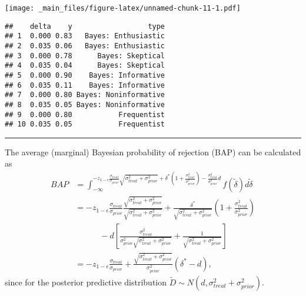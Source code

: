 \documentclass[
]{book}
\newenvironment{Shaded}{\begin{snugshade}}{\end{snugshade}}
\newcommand{\DecValTok}[1]{\textcolor[rgb]{0.00,0.00,0.81}{#1}}
\newcommand{\FunctionTok}[1]{\textcolor[rgb]{0.00,0.00,0.00}{#1}}
\newcommand{\NormalTok}[1]{#1}
\newcommand{\OtherTok}[1]{\textcolor[rgb]{0.56,0.35,0.01}{#1}}
\newcommand{\SpecialCharTok}[1]{\textcolor[rgb]{0.00,0.00,0.00}{#1}}
\newcommand{\StringTok}[1]{\textcolor[rgb]{0.31,0.60,0.02}{#1}}
\begin{document}
\texttt{[image: \_main\_files/figure-latex/unnamed-chunk-11-1.pdf]}

\begin{Shaded}
\end{Shaded}

\begin{verbatim}
##    delta    y                  type
## 1  0.000 0.83   Bayes: Enthusiastic
## 2  0.035 0.06   Bayes: Enthusiastic
## 3  0.000 0.78      Bayes: Skeptical
## 4  0.035 0.04      Bayes: Skeptical
## 5  0.000 0.90    Bayes: Informative
## 6  0.035 0.11    Bayes: Informative
## 7  0.000 0.80 Bayes: Noninformative
## 8  0.035 0.05 Bayes: Noninformative
## 9  0.000 0.80           Frequentist
## 10 0.035 0.05           Frequentist
\end{verbatim}

\begin{center}\rule{0.5\linewidth}{0.5pt}\end{center}

The average (marginal) Bayesian probability of rejection (BAP) can be calculated as
\[
\begin{aligned}
BAP&=\int_{-\infty}^{-z_{1-\epsilon}\frac{\sigma_{treat}}{\sigma_{prior}}\sqrt{\sigma^2_{treat}+\sigma^2_{prior}}+\delta^*\left(1+\frac{\sigma_{treat}^2}{\sigma_{prior}^2}\right)-\frac{\sigma^2_{treat}}{\sigma^2_{prior}}d} f(\tilde \delta)d\tilde \delta
\\&=-z_{1-\epsilon}\frac{\sigma_{treat}}{\sigma_{prior}}\frac{\sqrt{\sigma^2_{treat}+\sigma^2_{prior}}}{\sqrt{\sigma^2_{treat}+\sigma^2_{prior}}}+\frac{\delta^*}{\sqrt{\sigma^2_{treat}+\sigma^2_{prior}}}\left(1+\frac{\sigma_{treat}^2}{\sigma_{prior}^2}\right)\\
&\quad \quad \quad-d\left[\frac{\sigma^2_{treat}}{\sigma^2_{prior}\sqrt{\sigma^2_{treat}+\sigma^2_{prior}}}+\frac{1}{\sqrt{\sigma^2_{treat}+\sigma^2_{prior}}}\right] \\
&=-z_{1-\epsilon}\frac{\sigma_{treat}}{\sigma_{prior}}+\frac{\sqrt{\sigma^2_{treat}+\sigma^2_{prior}}}{\sigma^2_{prior}}(\delta^*-d),
\end{aligned}
\]
since for the posterior predictive distribution \(\tilde D \sim N(d, \sigma_{treat}^2+\sigma_{prior}^2)\).
\end{document}
